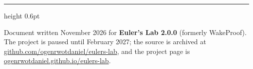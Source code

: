 \documentclass[11pt,a4paper]{article}
\begin{document}
\vspace{8pt}
{\color{wpborder}\hrule height 0.6pt}
\vspace{4pt}
{\sloppy\sffamily\footnotesize\color{wpmuted}Document written November 2026 for \textbf{Euler's Lab 2.0.0} (formerly WakeProof). The project is paused until February 2027; the source is archived at \href{https://github.com/ogenrwotdaniel/eulers-lab}{github.com/ogenrwotdaniel/eulers-lab}, and the project page is \href{https://ogenrwotdaniel.github.io/eulers-lab/}{ogenrwotdaniel.github.io/eulers-lab}.\par}
\end{document}
